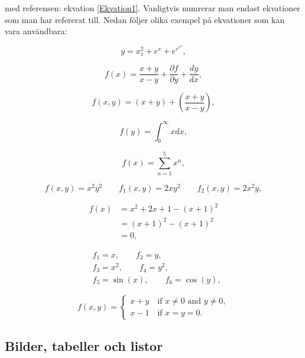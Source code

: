 \noindent med referensen: ekvation \eqref{Ekvation1}. Vanligtvis numrerar man endast ekvationer som man har refererat till. Nedan följer olika exempel på ekvationer som kan vara användbara:

\begin{equation}
	y = x_1^2+e^{x}+e^{e^{e^{x}}},
\end{equation}

\begin{equation}
	f(x) = \frac{x+y}{x-y} + \frac{\partial f}{\partial y} + \frac{dy}{dx},
\end{equation}

\begin{equation}
	f(x,y) = ( x+y ) + \left( \frac{x+y}{x-y} \right),
\end{equation}

\begin{equation}
	f(y) = \int_0^\infty x dx,
\end{equation}

\begin{equation}
	f(x) = \sum_{n=1}^{5} x^n,
\end{equation}

\begin{equation}
	f(x,y) = x^2 y^2 \qquad f_1(x,y) = 2xy^2 \qquad f_2(x,y) = 2x^2y,
\end{equation}

\begin{align*}
	f(x) & = x^2 + 2x + 1 - (x+1)^2 \\
    & = (x+1)^2 -(x+1)^2 \\
    & = 0,
\end{align*}

\begin{align}
	& f_1 = x, \qquad f_2 = y, \\
    & f_3 = x^2, \qquad f_4=y^2, \\
    & f_5 = \sin (x), \qquad f_6 = \cos (y),
\end{align}

\[
  f(x,y) = \begin{cases}
      x+y \quad \text{if } x\neq 0 \text{ and } y\neq 0, \\
      x-1 \quad \text{if } x=y=0.
  \end{cases}
\]


\subsection{Bilder, tabeller och listor}

